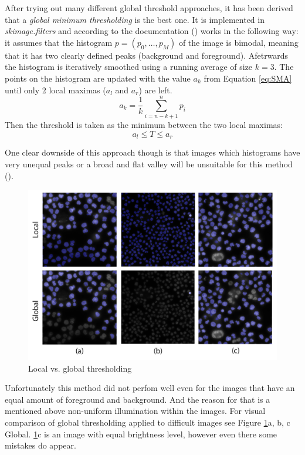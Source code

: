 After trying out many different global threshold approaches, it has been derived that a \textit{global minimum thresholding} is the best one. It is implemented in \textit{skimage.filters} and according to the documentation (\cite{global_thresh}) works in the following way: it assumes that the histogram $p = (p_0, \ldots, p_{M})$ of the image is bimodal, meaning that it has two clearly defined peaks (background and foreground). Afetrwards the histogram is iteratively smoothed using a running average of size $k=3$. The points on the histogram are updated with the value $a_k$ from Equation \ref{eq:SMA} until only 2 local maximas ($a_l$ and $a_r$) are left. 
\begin{equation}
    a_k = \frac{1}{k}\sum_{i=n-k + 1}^{n}p_i
\label{eq:SMA}
\end{equation}
Then the threshold is taken as the minimum between the two local maximas:
\begin{equation}
    a_l \leq T \leq a_r
\end{equation}

One clear downside of this approach though is that images which histograms have very unequal peaks or a broad and flat valley will be unsuitable for this method (\cite{thresholding_skimage}).

\begin{figure}[htb]
	\begin{center}
		\includegraphics[width=0.6\linewidth]{bilder/difficult-lightning/local-vs-global.png}
		\caption{Local vs. global thresholding}\label{fig:thresholding-bad-conditions}
	\end{center}
\end{figure}

Unfortunately this method did not perfom well even for the images that have an equal amount of foreground and background. And the reason for that is a mentioned above non-uniform illumination within the images. For visual comparison of global thresholding applied to difficult images see Figure \ref{fig:thresholding-bad-conditions}a, b, c Global. \ref{fig:thresholding-bad-conditions}c is an image with equal brightness level, however even there some mistakes do appear.

